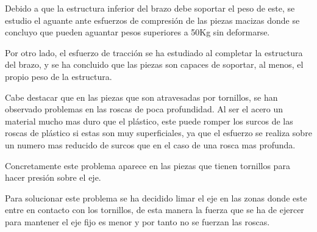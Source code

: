 Debido a que la estructura inferior del brazo debe soportar el peso de este, se estudio el aguante ante esfuerzos de compresión de las piezas macizas donde se concluyo que pueden aguantar pesos superiores a 50Kg sin deformarse.

Por otro lado, el esfuerzo de tracción se ha estudiado al completar la estructura del brazo, y se ha concluido que las piezas son capaces de soportar, al menos, el propio peso de la estructura.


Cabe destacar que en las piezas que son atravesadas por tornillos, se han observado problemas en las roscas de poca profundidad. Al ser el acero un material mucho mas duro que el plástico, este puede romper los surcos de las roscas de plástico si estas son muy superficiales, ya que el esfuerzo se realiza sobre un numero mas reducido de surcos que en el caso de una rosca mas profunda. 

Concretamente este problema aparece en las piezas que tienen tornillos para hacer presión sobre el eje.

Para solucionar este problema se ha decidido limar el eje en las zonas donde este entre en contacto con los tornillos, de esta manera la fuerza que se ha de ejercer para mantener el eje fijo es menor y por tanto no se fuerzan las roscas.